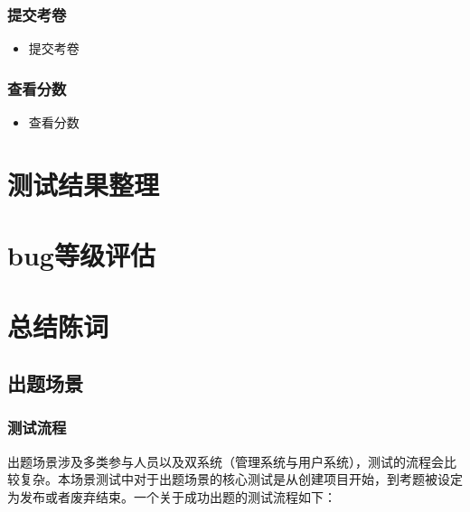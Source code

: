 \documentclass[hyperref, a4paper]{ctexart}
\providecommand{\tightlist}{%
  \setlength{\itemsep}{0pt}\setlength{\parskip}{0pt}}
\begin{document}
\hypertarget{ux63d0ux4ea4ux8003ux5377-1}{%
\subsubsection{提交考卷}\label{ux63d0ux4ea4ux8003ux5377-1}}

\begin{itemize}
\tightlist
\item
  提交考卷
\end{itemize}

\hypertarget{ux67e5ux770bux5206ux6570-1}{%
\subsubsection{查看分数}\label{ux67e5ux770bux5206ux6570-1}}

\begin{itemize}
\tightlist
\item
  查看分数
\end{itemize}

\hypertarget{ux6d4bux8bd5ux7ed3ux679cux6574ux7406}{%
\section{测试结果整理}\label{ux6d4bux8bd5ux7ed3ux679cux6574ux7406}}

\hypertarget{bugux7b49ux7ea7ux8bc4ux4f30}{%
\section{bug等级评估}\label{bugux7b49ux7ea7ux8bc4ux4f30}}

\hypertarget{ux603bux7ed3ux9648ux8bcd}{%
\section{总结陈词}\label{ux603bux7ed3ux9648ux8bcd}}

\hypertarget{ux51faux9898ux573aux666f-1}{%
\subsection{出题场景}\label{ux51faux9898ux573aux666f-1}}

\hypertarget{ux6d4bux8bd5ux6d41ux7a0b}{%
\subsubsection{测试流程}\label{ux6d4bux8bd5ux6d41ux7a0b}}

出题场景涉及多类参与人员以及双系统（管理系统与用户系统），测试的流程会比较复杂。本场景测试中对于出题场景的核心测试是从创建项目开始，到考题被设定为发布或者废弃结束。一个关于成功出题的测试流程如下：
\end{document}
